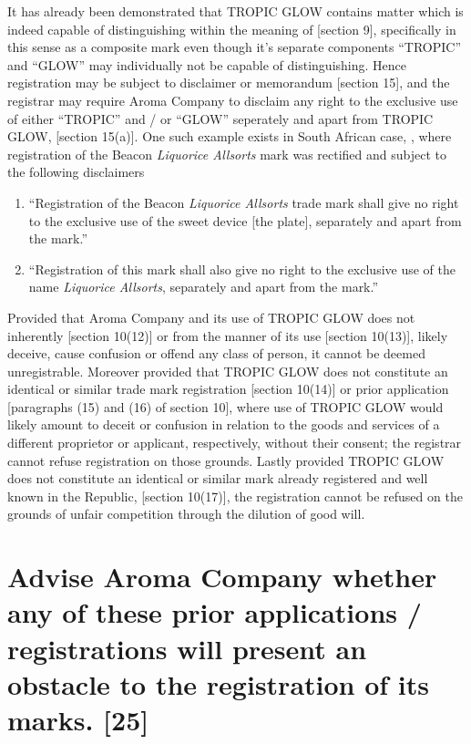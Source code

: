 \documentclass[11pt]{article}
\begin{document}
It has already been demonstrated that TROPIC GLOW contains matter which is
indeed capable of distinguishing within the meaning of [section
9]\cite{rsa93_tm_act}, specifically in this sense as a composite mark even though
it's separate components ``TROPIC'' and ``GLOW'' may individually not be capable
of distinguishing. Hence registration may be subject to disclaimer or memorandum
[section 15]\cite{rsa93_tm_act}, and the registrar may require Aroma Company to
disclaim any right to the exclusive use of either ``TROPIC'' and / or ``GLOW''
seperately and apart from TROPIC GLOW, [section 15(a)]\cite{rsa93_tm_act}. One
such example exists in South African case, 
\cite{vivier2000_cadbury_v_beacon}, where registration of the Beacon \emph{Liquorice
Allsorts} mark was rectified and subject to the following disclaimers
\begin{enumerate}
\item ``Registration of the Beacon \textit{Liquorice Allsorts} trade mark shall give no right to the exclusive use
of the sweet device [the plate], separately and apart from the mark.''
\item ``Registration of this mark shall also give no right to the exclusive use
of the name \textit{Liquorice Allsorts}, separately and apart from the mark.''
\end{enumerate}

Provided that Aroma Company and its use of TROPIC GLOW does not inherently [section 10(12)]\cite{rsa93_tm_act}
or from the manner of its use [section 10(13)]\cite{rsa93_tm_act}, likely
deceive, cause confusion or offend any class of person, it cannot be deemed
unregistrable. Moreover provided that TROPIC GLOW does not constitute an
identical or similar trade mark registration [section 10(14)]\cite{rsa93_tm_act}
or prior application [paragraphs (15) and (16) of section 10]\cite{rsa93_tm_act},
where use of TROPIC GLOW would likely amount to deceit or confusion in relation
to the goods and services of a different proprietor or applicant, respectively,
without their consent; the registrar cannot refuse registration on those
grounds. Lastly provided TROPIC GLOW does not constitute an identical or similar
mark already registered and well known in the Republic, [section
10(17)]\cite{rsa93_tm_act}, the registration cannot be refused on the grounds of
unfair competition through the dilution of good will.

\section{Advise Aroma Company whether any of these prior applications / registrations will present an obstacle to the registration of its marks. [25]}
\label{sec:orgd8fc367}
\end{document}
